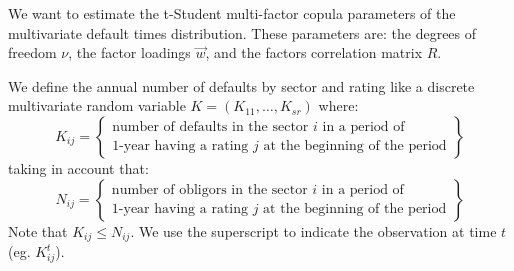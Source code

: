 \documentclass[11pt,fleqn]{book} %
\begin{document}
We want to estimate the t-Student multi-factor copula parameters of the 
multivariate default times distribution. These parameters are: the degrees of 
freedom $\nu$, the factor loadings $\vec{w}$, and the factors correlation 
matrix $R$.

\begin{definition}
	We define the annual number of defaults by sector and rating like a
	discrete multivariate random variable $K=(K_{11}, \dots, K_{sr})$ where:
	\begin{displaymath}
		K_{ij} = \left\{
		\begin{array}{c}
			\text{number of defaults in the sector $i$ in a period of} \\
			\text{1-year having a rating $j$ at the beginning of the period}
		\end{array}
		\right\}
	\end{displaymath}
	taking in account that:
	\begin{displaymath}
		N_{ij} = \left\{
		\begin{array}{c}
			\text{number of obligors in the sector $i$ in a period of} \\
			\text{1-year having a rating $j$ at the beginning of the period}
		\end{array}
		\right\}
	\end{displaymath}
	Note that $K_{ij} \le N_{ij}$. We use the superscript to indicate 
	the observation at time $t$ (eg. $K_{ij}^t$). \\
	\ 
\end{definition}
\end{document}
